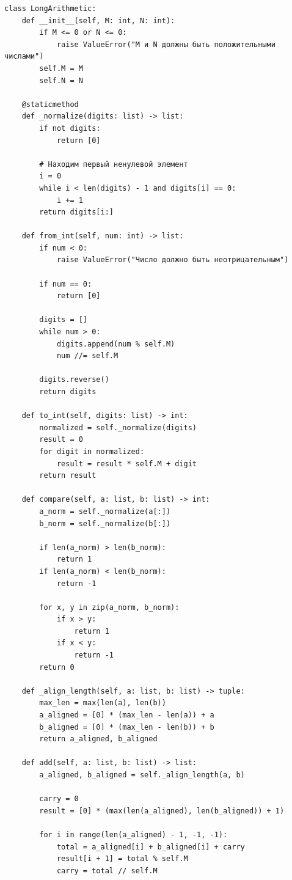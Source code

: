 \documentclass{article}[14pt]
\begin{document}
\begin{lstlisting}[caption={Код исправленной программы}, label=lst:fixed-code]
class LongArithmetic:
    def __init__(self, M: int, N: int):
        if M <= 0 or N <= 0:
            raise ValueError("M и N должны быть положительными числами")
        self.M = M
        self.N = N
    
    @staticmethod
    def _normalize(digits: list) -> list:
        if not digits:
            return [0]
        
        # Находим первый ненулевой элемент
        i = 0
        while i < len(digits) - 1 and digits[i] == 0:
            i += 1
        return digits[i:]
    
    def from_int(self, num: int) -> list:
        if num < 0:
            raise ValueError("Число должно быть неотрицательным")
        
        if num == 0:
            return [0]
        
        digits = []
        while num > 0:
            digits.append(num % self.M)
            num //= self.M
        
        digits.reverse()
        return digits
    
    def to_int(self, digits: list) -> int:
        normalized = self._normalize(digits)
        result = 0
        for digit in normalized:
            result = result * self.M + digit
        return result
    
    def compare(self, a: list, b: list) -> int:
        a_norm = self._normalize(a[:])
        b_norm = self._normalize(b[:])
        
        if len(a_norm) > len(b_norm):
            return 1
        if len(a_norm) < len(b_norm):
            return -1
        
        for x, y in zip(a_norm, b_norm):
            if x > y:
                return 1
            if x < y:
                return -1
        return 0
    
    def _align_length(self, a: list, b: list) -> tuple:
        max_len = max(len(a), len(b))
        a_aligned = [0] * (max_len - len(a)) + a
        b_aligned = [0] * (max_len - len(b)) + b
        return a_aligned, b_aligned
    
    def add(self, a: list, b: list) -> list:
        a_aligned, b_aligned = self._align_length(a, b)
        
        carry = 0
        result = [0] * (max(len(a_aligned), len(b_aligned)) + 1)
        
        for i in range(len(a_aligned) - 1, -1, -1):
            total = a_aligned[i] + b_aligned[i] + carry
            result[i + 1] = total % self.M
            carry = total // self.M
        

\end{lstlisting}
\end{document}
